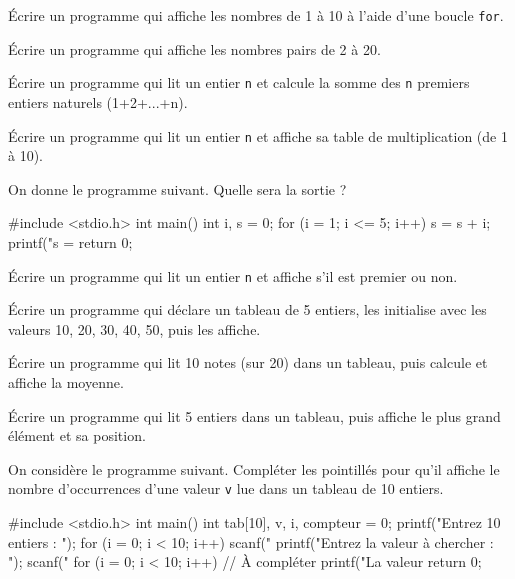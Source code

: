 
\exo{}
Écrire un programme qui affiche les nombres de 1 à 10 à l'aide d'une boucle \texttt{for}.

\exo{}
Écrire un programme qui affiche les nombres pairs de 2 à 20.

\exo{}
Écrire un programme qui lit un entier \texttt{n} et calcule la somme des \texttt{n} premiers entiers naturels (1+2+...+n).

\exo{}
Écrire un programme qui lit un entier \texttt{n} et affiche sa table de multiplication (de 1 à 10).

\exo{}\sujetbac[2022, D]{}
On donne le programme suivant. Quelle sera la sortie ?

\begin{ccode}
#include <stdio.h>
int main() {
    int i, s = 0;
    for (i = 1; i <= 5; i++) {
        s = s + i;
    }
    printf("s = %
    return 0;
}
\end{ccode}

\exo{}
Écrire un programme qui lit un entier \texttt{n} et affiche s'il est premier ou non.


\exo{}
Écrire un programme qui déclare un tableau de 5 entiers, les initialise avec les valeurs 10, 20, 30, 40, 50, puis les affiche.

\exo{}
Écrire un programme qui lit 10 notes (sur 20) dans un tableau, puis calcule et affiche la moyenne.

\exo{}
Écrire un programme qui lit 5 entiers dans un tableau, puis affiche le plus grand élément et sa position.

\exo{}\sujetbac[2021, C]{}
On considère le programme suivant. Compléter les pointillés pour qu'il affiche le nombre d'occurrences d'une valeur \texttt{v} lue dans un tableau de 10 entiers.

\begin{ccode}
#include <stdio.h>
int main() {
    int tab[10], v, i, compteur = 0;
    printf("Entrez 10 entiers : ");
    for (i = 0; i < 10; i++) {
        scanf("%
    }
    printf("Entrez la valeur à chercher : ");
    scanf("%
    for (i = 0; i < 10; i++) {
        // À compléter
    }
    printf("La valeur %
    return 0;
}
\end{ccode}


